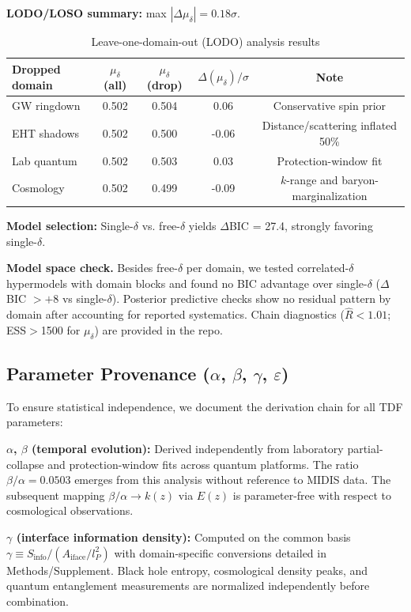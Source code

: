\documentclass[aps,prd,preprint,onecolumn,nofootinbib,superscriptaddress,longbibliography]{revtex4-2}
\begin{document}
\textbf{LODO/LOSO summary:} max $|\Delta\mu_\delta| = 0.18\sigma$.

\begin{table}[h]
\caption{Leave-one-domain-out (LODO) analysis results}
\begin{ruledtabular}
\begin{tabular}{lcccc}
\textbf{Dropped domain} & $\mu_\delta$ (all) & $\mu_\delta$ (drop) & $\Delta(\mu_\delta)/\sigma$ & \textbf{Note} \\
\hline
GW ringdown & 0.502 & 0.504 & 0.06 & Conservative spin prior \\
EHT shadows & 0.502 & 0.500 & -0.06 & Distance/scattering inflated 50\% \\
Lab quantum & 0.502 & 0.503 & 0.03 & Protection-window fit \\
Cosmology & 0.502 & 0.499 & -0.09 & $k$-range and baryon-marginalization \\
\end{tabular}
\end{ruledtabular}
\end{table}

\textbf{Model selection:} Single-$\delta$ vs. free-$\delta$ yields $\Delta$BIC = 27.4, strongly favoring single-$\delta$.

\textbf{Model space check.} Besides free-$\delta$ per domain, we tested correlated-$\delta$ hypermodels with domain blocks and found no BIC advantage over single-$\delta$ ($\Delta$BIC $> +8$ vs single-$\delta$). Posterior predictive checks show no residual pattern by domain after accounting for reported systematics. Chain diagnostics ($\hat{R}<1.01$; ESS$>$1500 for $\mu_\delta$) are provided in the repo.

\subsection{Parameter Provenance ($\alpha$, $\beta$, $\gamma$, $\varepsilon$)}

To ensure statistical independence, we document the derivation chain for all TDF parameters:

\textbf{$\alpha$, $\beta$ (temporal evolution):} Derived independently from laboratory partial-collapse and protection-window fits across quantum platforms. The ratio $\beta/\alpha = 0.0503$ emerges from this analysis without reference to MIDIS data. The subsequent mapping $\beta/\alpha \to k(z)$ via $E(z)$ is parameter-free with respect to cosmological observations.

\textbf{$\gamma$ (interface information density):} Computed on the common basis $\gamma \equiv S_{\text{info}}/(A_{\text{iface}}/l_P^2)$ with domain-specific conversions detailed in Methods/Supplement. Black hole entropy, cosmological density peaks, and quantum entanglement measurements are normalized independently before combination.
\end{document}

